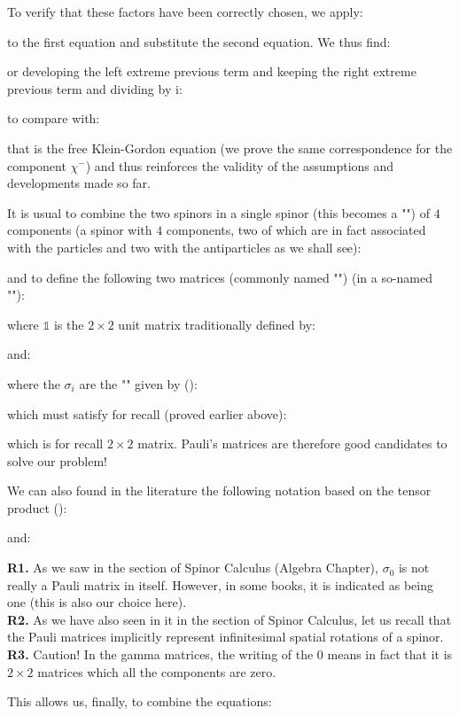 	To verify that these factors have been correctly chosen, we apply:
	
	to the first equation and substitute the second equation. We thus find:
	
	or developing the left extreme previous term and keeping the right extreme previous term and dividing by $\mathrm{i}$:
	
	to compare with:
	
	that is the free Klein-Gordon equation (we prove the same correspondence for the component $\chi^{-}$) and thus reinforces the validity of the assumptions and developments made so far.

	It is usual to combine the two spinors in a single spinor (this becomes a "") of $4$ components (a spinor with $4$ components, two of which are in fact associated with the particles and two with the antiparticles as we shall see):
	
	and to define the following two matrices (commonly named "") (in a so-named ""):
	
	where $\mathds{1}$ is the $2\times 2$ unit matrix traditionally defined by:
	
	and:
	
	where the $\sigma_i$ are the "\label{pauli matrices}" given by ():
	
	which must satisfy for recall (proved earlier above):
	
	which is for recall $2\times 2$ matrix. Pauli's matrices are therefore good candidates to solve our problem!
	
	We can also found in the literature the following notation based on the tensor product ():
	
	and:
	
	\begin{tcolorbox}[title=Remarks,colframe=black,arc=10pt]
	\textbf{R1.} As we saw in the section of Spinor Calculus (Algebra Chapter), $\sigma_0$ is not really a Pauli matrix in itself. However, in some books, it is indicated as being one (this is also our choice here).\\
	
	\textbf{R2.} As we have also seen in it in the section of Spinor Calculus, let us recall that the Pauli matrices implicitly represent infinitesimal spatial rotations of a spinor.\\
	
	\textbf{R3.} Caution! In the gamma matrices, the writing of the $0$ means in fact that it is $2\times 2$ matrices  which all the components are zero.
	\end{tcolorbox}	
	This allows us, finally, to combine the equations:
	
